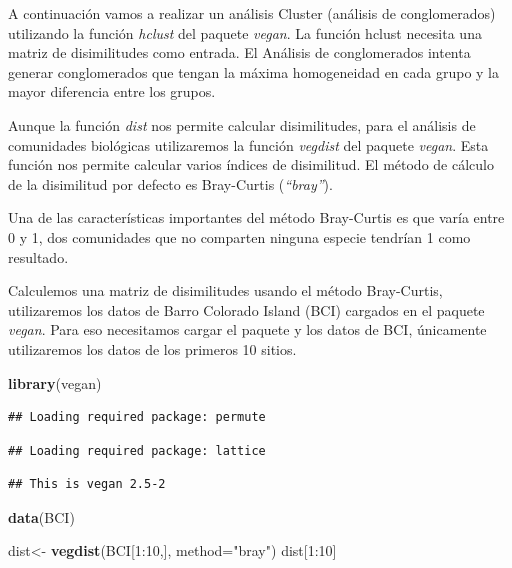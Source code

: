 \documentclass[]{book}
\newenvironment{Shaded}{\begin{snugshade}}{\end{snugshade}}
\newcommand{\KeywordTok}[1]{\textcolor[rgb]{0.13,0.29,0.53}{\textbf{{#1}}}}
\newcommand{\DataTypeTok}[1]{\textcolor[rgb]{0.13,0.29,0.53}{{#1}}}
\newcommand{\DecValTok}[1]{\textcolor[rgb]{0.00,0.00,0.81}{{#1}}}
\newcommand{\StringTok}[1]{\textcolor[rgb]{0.31,0.60,0.02}{{#1}}}
\newcommand{\NormalTok}[1]{{#1}}
\begin{document}
A continuación vamos a realizar un análisis Cluster (análisis de
conglomerados) utilizando la función \emph{hclust} del paquete
\emph{vegan}. La función hclust necesita una matriz de disimilitudes
como entrada. El Análisis de conglomerados intenta generar conglomerados
que tengan la máxima homogeneidad en cada grupo y la mayor diferencia
entre los grupos.

Aunque la función \emph{dist} nos permite calcular disimilitudes, para
el análisis de comunidades biológicas utilizaremos la función
\emph{vegdist} del paquete \emph{vegan}. Esta función nos permite
calcular varios índices de disimilitud. El método de cálculo de la
disimilitud por defecto es Bray-Curtis (\emph{``bray''}).

Una de las características importantes del método Bray-Curtis es que
varía entre 0 y 1, dos comunidades que no comparten ninguna especie
tendrían 1 como resultado.

Calculemos una matriz de disimilitudes usando el método Bray-Curtis,
utilizaremos los datos de Barro Colorado Island (BCI) cargados en el
paquete \emph{vegan}. Para eso necesitamos cargar el paquete y los datos
de BCI, únicamente utilizaremos los datos de los primeros 10 sitios.

\begin{Shaded}
\begin{Highlighting}[]
\KeywordTok{library}\NormalTok{(vegan)}
\end{Highlighting}
\end{Shaded}

\begin{verbatim}
## Loading required package: permute
\end{verbatim}

\begin{verbatim}
## Loading required package: lattice
\end{verbatim}

\begin{verbatim}
## This is vegan 2.5-2
\end{verbatim}

\begin{Shaded}
\begin{Highlighting}[]
\KeywordTok{data}\NormalTok{(BCI)}

\NormalTok{dist<-}\StringTok{ }\KeywordTok{vegdist}\NormalTok{(BCI[}\DecValTok{1}\NormalTok{:}\DecValTok{10}\NormalTok{,], }\DataTypeTok{method=}\StringTok{"bray"}\NormalTok{)}
\NormalTok{dist[}\DecValTok{1}\NormalTok{:}\DecValTok{10}\NormalTok{]}
\end{Highlighting}
\end{Shaded}
\end{document}
